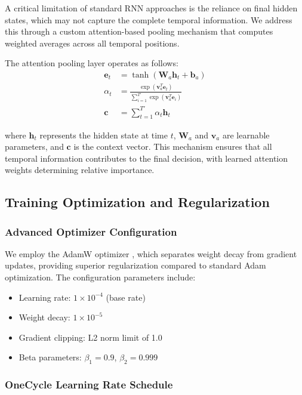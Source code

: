 \documentclass[conference]{IEEEtran}
\begin{document}
A critical limitation of standard RNN approaches is the reliance on final hidden states, which may not capture the complete temporal information. We address this through a custom attention-based pooling mechanism that computes weighted averages across all temporal positions.

The attention pooling layer operates as follows:
\begin{align}
\mathbf{e}_t &= \tanh(\mathbf{W}_a \mathbf{h}_t + \mathbf{b}_a) \\
\alpha_t &= \frac{\exp(\mathbf{v}_a^T \mathbf{e}_t)}{\sum_{i=1}^{T'} \exp(\mathbf{v}_a^T \mathbf{e}_i)} \\
\mathbf{c} &= \sum_{t=1}^{T'} \alpha_t \mathbf{h}_t
\end{align}

where $\mathbf{h}_t$ represents the hidden state at time $t$, $\mathbf{W}_a$ and $\mathbf{v}_a$ are learnable parameters, and $\mathbf{c}$ is the context vector. This mechanism ensures that all temporal information contributes to the final decision, with learned attention weights determining relative importance.

\subsection{Training Optimization and Regularization}

\subsubsection{Advanced Optimizer Configuration}

We employ the AdamW optimizer \cite{loshchilov2017decoupled}, which separates weight decay from gradient updates, providing superior regularization compared to standard Adam optimization. The configuration parameters include:

\begin{itemize}
\item Learning rate: $1 \times 10^{-4}$ (base rate)
\item Weight decay: $1 \times 10^{-5}$
\item Gradient clipping: L2 norm limit of 1.0
\item Beta parameters: $\beta_1 = 0.9$, $\beta_2 = 0.999$
\end{itemize}

\subsubsection{OneCycle Learning Rate Schedule}
\end{document}
